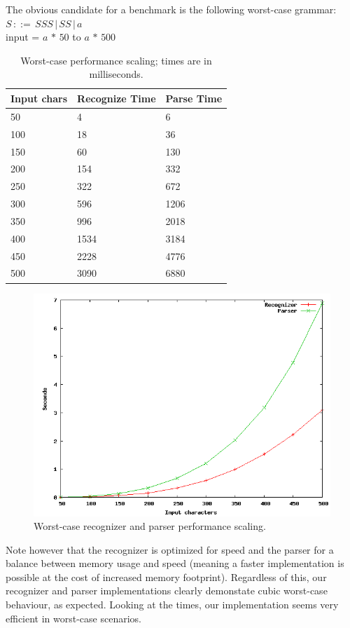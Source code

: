 \documentclass[a4paper,10pt]{article}
\begin{document}
The obvious candidate for a benchmark is the following worst-case grammar:
$S\,::=\,SSS\,|\,SS\,|\,a$\\
input = $a\,*\,50$ to $a\,*\,500$

\begin{table}[H]
\centering
\begin{tabular}{ | p{5em} | p{7em} | p{6em} | }
  \hline
  Input chars & Recognize Time & Parse Time \\
  \hline
  50 & 4 & 6 \\
  100 & 18 & 36 \\
  150 & 60 & 130 \\
  200 & 154 & 332 \\
  250 & 322 & 672 \\
  300 & 596 & 1206 \\
  350 & 996 & 2018 \\
  400 & 1534 & 3184 \\
  450 & 2228 & 4776 \\
  500 & 3090 & 6880 \\
  \hline
\end{tabular}
\caption{Worst-case performance scaling; times are in milliseconds.}
\end{table}

\begin{figure}[H]
\centering
\includegraphics[scale=0.5]{worst-case.png}
\caption{Worst-case recognizer and parser performance scaling.}
\end{figure}

Note however that the recognizer is optimized for speed and the parser for a balance between memory usage and speed (meaning a faster implementation is possible at the cost of increased memory footprint). Regardless of this, our recognizer and parser implementations clearly demonstate cubic worst-case behaviour, as expected. Looking at the times, our implementation seems very efficient in worst-case scenarios.
\end{document}
